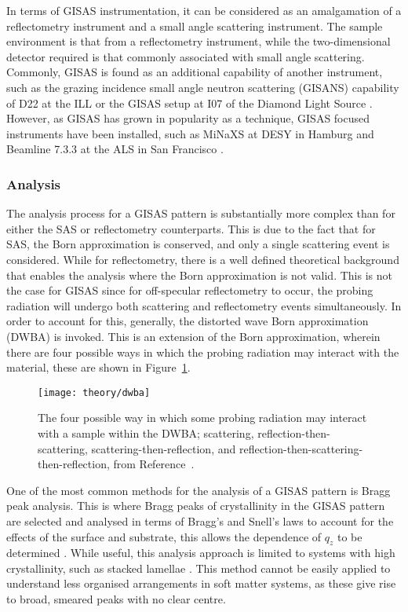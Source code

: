 In terms of GISAS instrumentation, it can be considered as an amalgamation of a reflectometry instrument and a small angle scattering instrument.
The sample environment is that from a reflectometry instrument, while the two-dimensional detector required is that commonly associated with small angle scattering.
Commonly, GISAS is found as an additional capability of another instrument, such as the grazing incidence small angle neutron scattering (GISANS) capability of D22 at the ILL or the GISAS setup at I07 of the Diamond Light Source \cite{muller-buschbaum_grazing_2004,nicklin_diamond_2016}.
However, as GISAS has grown in popularity as a technique, GISAS focused instruments have been installed, such as MiNaXS at DESY in Hamburg and Beamline 7.3.3 at the ALS in San Francisco \cite{buffet_p03_2012,hexemer_saxs/waxs/gisaxs_2010}.

\subsubsection{Analysis}

The analysis process for a GISAS pattern is substantially more complex than for either the SAS or reflectometry counterparts.
This is due to the fact that for SAS, the Born approximation is conserved, and only a single scattering event is considered.
While for reflectometry, there is a well defined theoretical background that enables the analysis where the Born approximation is not valid.
This is not the case for GISAS since for off-specular reflectometry to occur, the probing radiation will undergo both scattering and reflectometry events simultaneously.
In order to account for this, generally, the distorted wave Born approximation (DWBA) is invoked.
This is an extension of the Born approximation, wherein there are four possible ways in which the probing radiation may interact with the material, these are shown in Figure~\ref{fig:dwba}.
%
\begin{figure}
    \centering
    \texttt{[image: theory/dwba]}
    \caption{The four possible way in which some probing radiation may interact with a sample within the DWBA; scattering, reflection-then-scattering, scattering-then-reflection, and reflection-then-scattering-then-reflection, from Reference~\cite{hexemer_advanced_2015}.}
    \label{fig:dwba}
\end{figure}
%

One of the most common methods for the analysis of a GISAS pattern is Bragg peak analysis.
This is where Bragg peaks of crystallinity in the GISAS pattern are selected and analysed in terms of Bragg's and Snell's laws to account for the effects of the surface and substrate, this allows the dependence of $q_z$ to be determined \cite{lee_electron_2007, busch_grazing-incidence_2006}.
While useful, this analysis approach is limited to systems with high crystallinity, such as stacked lamellae \cite{busch_inner_2007}.
This method cannot be easily applied to understand less organised arrangements in soft matter systems, as these give rise to broad, smeared peaks with no clear centre.

